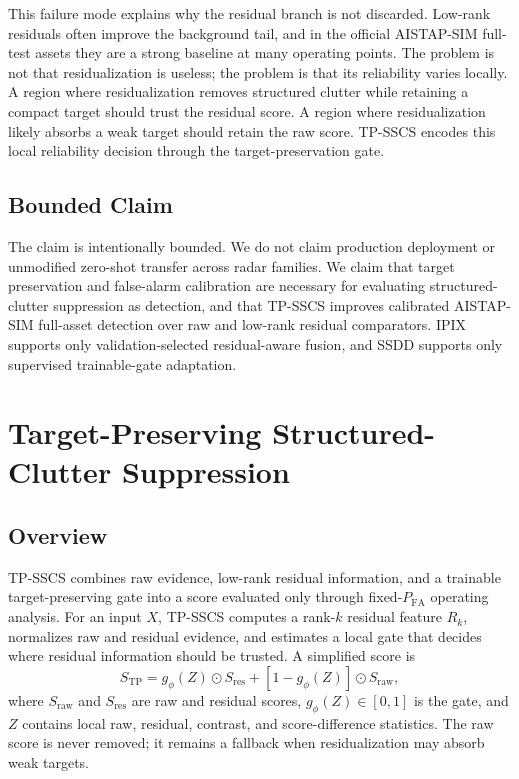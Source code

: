 \documentclass[journal]{IEEEtran}
\begin{document}
This failure mode explains why the residual branch is not discarded. Low-rank residuals often improve the background tail, and in the official AISTAP-SIM full-test assets they are a strong baseline at many operating points. The problem is not that residualization is useless; the problem is that its reliability varies locally. A region where residualization removes structured clutter while retaining a compact target should trust the residual score. A region where residualization likely absorbs a weak target should retain the raw score. TP-SSCS encodes this local reliability decision through the target-preservation gate.

\subsection{Bounded Claim}

The claim is intentionally bounded. We do not claim production deployment or unmodified zero-shot transfer across radar families. We claim that target preservation and false-alarm calibration are necessary for evaluating structured-clutter suppression as detection, and that TP-SSCS improves calibrated AISTAP-SIM full-asset detection over raw and low-rank residual comparators. IPIX supports only validation-selected residual-aware fusion, and SSDD supports only supervised trainable-gate adaptation.

\section{Target-Preserving Structured-Clutter Suppression}

\subsection{Overview}

TP-SSCS combines raw evidence, low-rank residual information, and a trainable target-preserving gate into a score evaluated only through fixed-$P_{\mathrm{FA}}$ operating analysis. For an input $X$, TP-SSCS computes a rank-$k$ residual feature $R_k$, normalizes raw and residual evidence, and estimates a local gate that decides where residual information should be trusted. A simplified score is
\begin{equation}
    S_{\mathrm{TP}} = g_\phi(Z) \odot S_{\mathrm{res}} +
    [1 - g_\phi(Z)] \odot S_{\mathrm{raw}},
\end{equation}
where $S_{\mathrm{raw}}$ and $S_{\mathrm{res}}$ are raw and residual scores, $g_\phi(Z)\in[0,1]$ is the gate, and $Z$ contains local raw, residual, contrast, and score-difference statistics. The raw score is never removed; it remains a fallback when residualization may absorb weak targets.
\end{document}
